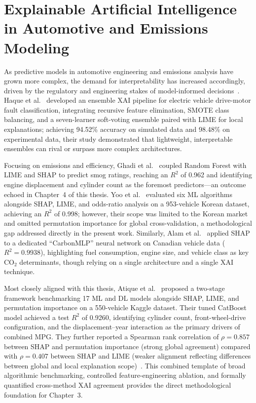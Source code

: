 \section{Explainable Artificial Intelligence in Automotive and Emissions Modeling}

As predictive models in automotive engineering and emissions analysis have grown more complex, the demand for interpretability has increased accordingly, driven by the regulatory and engineering stakes of model-informed decisions~\cite{minh2022explainable}\cite{hassija2024interpreting}\cite{chen2025need}. Haque et al.~\cite{haque2025ensemblexai} developed an ensemble XAI pipeline for electric vehicle drive-motor fault classification, integrating recursive feature elimination, SMOTE class balancing, and a seven-learner soft-voting ensemble paired with LIME for local explanations; achieving 94.52\% accuracy on simulated data and 98.48\% on experimental data, their study demonstrated that lightweight, interpretable ensembles can rival or surpass more complex architectures.

Focusing on emissions and efficiency, Ghadi et al.~\cite{ghadi2025explainable} coupled Random Forest with LIME and SHAP to predict smog ratings, reaching an $R^2$ of 0.962 and identifying engine displacement and cylinder count as the foremost predictors---an outcome echoed in Chapter~4 of this thesis. Yoo et al.~\cite{yoo2025machine} evaluated six ML algorithms alongside SHAP, LIME, and odds-ratio analysis on a 953-vehicle Korean dataset, achieving an $R^2$ of 0.998; however, their scope was limited to the Korean market and omitted permutation importance for global cross-validation, a methodological gap addressed directly in the present work. Similarly, Alam et al.~\cite{alam2025deep}\cite{hamed2021fuel} applied SHAP to a dedicated ``CarbonMLP'' neural network on Canadian vehicle data ($R^2 = 0.9938$), highlighting fuel consumption, engine size, and vehicle class as key CO$_2$ determinants, though relying on a single architecture and a single XAI technique.

Most closely aligned with this thesis, Atique et al.~\cite{atique2026explainable} proposed a two-stage framework benchmarking 17 ML and DL models alongside SHAP, LIME, and permutation importance on a 550-vehicle Kaggle dataset. Their tuned CatBoost model achieved a test $R^2$ of 0.9260, identifying cylinder count, front-wheel-drive configuration, and the displacement--year interaction as the primary drivers of combined MPG. They further reported a Spearman rank correlation of $\rho = 0.857$ between SHAP and permutation importance (strong global agreement) compared with $\rho = 0.407$ between SHAP and LIME (weaker alignment reflecting differences between global and local explanation scope)~\cite{atique2026explainable}. This combined template of broad algorithmic benchmarking, controlled feature-engineering ablation, and formally quantified cross-method XAI agreement provides the direct methodological foundation for Chapter~3.

